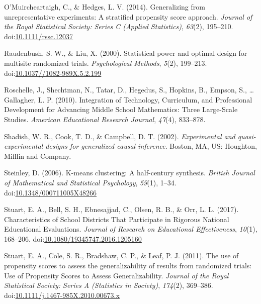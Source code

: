 \documentclass[man,floatsintext]{apa6}
\begin{document}
\leavevmode\hypertarget{ref-omuircheartaighGeneralizingUnrepresentativeExperiments2014}{}%
O'Muircheartaigh, C., \& Hedges, L. V. (2014). Generalizing from unrepresentative experiments: A stratified propensity score approach. \emph{Journal of the Royal Statistical Society: Series C (Applied Statistics)}, \emph{63}(2), 195--210. doi:\href{https://doi.org/10.1111/rssc.12037}{10.1111/rssc.12037}

\leavevmode\hypertarget{ref-raudenbushStatisticalPowerOptimal2000}{}%
Raudenbush, S. W., \& Liu, X. (2000). Statistical power and optimal design for multisite randomized trials. \emph{Psychological Methods}, \emph{5}(2), 199--213. doi:\href{https://doi.org/10.1037//1082-989X.5.2.199}{10.1037//1082-989X.5.2.199}

\leavevmode\hypertarget{ref-roschelleIntegrationTechnologyCurriculum2010}{}%
Roschelle, J., Shechtman, N., Tatar, D., Hegedus, S., Hopkins, B., Empson, S., \ldots{} Gallagher, L. P. (2010). Integration of Technology, Curriculum, and Professional Development for Advancing Middle School Mathematics: Three Large-Scale Studies. \emph{American Educational Research Journal}, \emph{47}(4), 833--878.

\leavevmode\hypertarget{ref-shadishExperimentalQuasiexperimentalDesigns2002}{}%
Shadish, W. R., Cook, T. D., \& Campbell, D. T. (2002). \emph{Experimental and quasi-experimental designs for generalized causal inference}. Boston, MA, US: Houghton, Mifflin and Company.

\leavevmode\hypertarget{ref-steinleyKmeansClusteringHalfcentury2006}{}%
Steinley, D. (2006). K-means clustering: A half-century synthesis. \emph{British Journal of Mathematical and Statistical Psychology}, \emph{59}(1), 1--34. doi:\href{https://doi.org/10.1348/000711005X48266}{10.1348/000711005X48266}

\leavevmode\hypertarget{ref-stuartCharacteristicsSchoolDistricts2017}{}%
Stuart, E. A., Bell, S. H., Ebnesajjad, C., Olsen, R. B., \& Orr, L. L. (2017). Characteristics of School Districts That Participate in Rigorous National Educational Evaluations. \emph{Journal of Research on Educational Effectiveness}, \emph{10}(1), 168--206. doi:\href{https://doi.org/10.1080/19345747.2016.1205160}{10.1080/19345747.2016.1205160}

\leavevmode\hypertarget{ref-stuartUsePropensityScores2011}{}%
Stuart, E. A., Cole, S. R., Bradshaw, C. P., \& Leaf, P. J. (2011). The use of propensity scores to assess the generalizability of results from randomized trials: Use of Propensity Scores to Assess Generalizability. \emph{Journal of the Royal Statistical Society: Series A (Statistics in Society)}, \emph{174}(2), 369--386. doi:\href{https://doi.org/10.1111/j.1467-985X.2010.00673.x}{10.1111/j.1467-985X.2010.00673.x}
\end{document}
